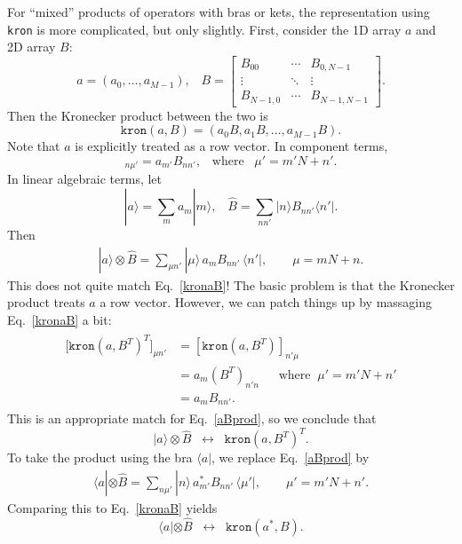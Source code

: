 \documentclass[prx,12pt]{revtex4-2}
\begin{document}
For ``mixed'' products of operators with bras or kets, the
representation using \texttt{kron} is more complicated, but only
slightly.  First, consider the 1D array $a$ and 2D array $B$:
\begin{equation}
  a = (a_0, \dots, a_{M-1}), \;\;\;
  B = \begin{bmatrix}B_{00} & \cdots & B_{0,N-1} \\ \vdots & \ddots & \vdots \\  B_{N-1,0} & \cdots & B_{N-1,N-1} \end{bmatrix}.
\end{equation}
Then the Kronecker product between the two is
\begin{equation}
  \texttt{kron}(a, B) = (a_0 B, a_1 B, \dots, a_{M-1} B).
\end{equation}
Note that $a$ is explicitly treated as a row vector.  In component
terms,
\begin{equation}
  [\texttt{kron}(a, B)]_{n\mu'} = a_{m'} B_{nn'}, \;\;\;\mathrm{where}\;\;\;
  \mu' = m'N+n'.
  \label{kronaB}
\end{equation}
In linear algebraic terms, let
\begin{equation}
  |a\rangle = \sum_m a_m |m\rangle, \;\;\; \hat{B} = \sum_{nn'}
  |n\rangle B_{nn'} \langle n'|.
\end{equation}
Then
\begin{align}
  |a\rangle \otimes \hat{B} = \sum_{\mu n'} |\mu\rangle \,
  a_m B_{nn'} \, \langle n'|, \qquad \mu = mN + n.
  \label{aBprod}
\end{align}
This does not quite match Eq.~\eqref{kronaB}!  The basic problem is
that the Kronecker product treats $a$ a row vector.  However, we can
patch things up by massaging Eq.~\eqref{kronaB} a bit:
\begin{align}
  \begin{aligned}
    \left.[\right.\texttt{kron}(a, B^T)^T]_{\mu n'} &=
    [\texttt{kron}(a, B^T)]_{n' \mu} \\
    &= a_{m} (B^T)_{n'n} \quad\;\;\mathrm{where}\;\; \mu' = m'N + n' \\
    &= a_{m} B_{nn'}.
  \end{aligned}
\end{align}
This is an appropriate match for Eq.~\eqref{aBprod}, so we conclude
that
\begin{equation}
  |a\rangle \otimes \hat{B} \;\;\leftrightarrow\;\;
  \texttt{kron}(a, B^T)^T.
\end{equation}
To take the product using the bra $\langle a|$, we replace
Eq.~\eqref{aBprod} by
\begin{align}
  \langle a| \otimes \hat{B} = \sum_{n\mu'} |n\rangle \,
  a_{m'}^* B_{nn'} \, \langle \mu'|, \qquad \mu' = m'N + n'.
\end{align}
Comparing this to Eq.~\eqref{kronaB} yields
\begin{equation}
  \langle a| \otimes \hat{B} \;\;\leftrightarrow\;\;
  \texttt{kron}(a^*, B).
\end{equation}
\end{document}
